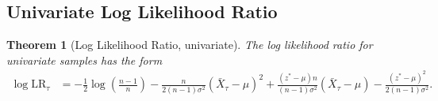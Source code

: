 \documentclass{article}
\theoremstyle{plain}
\newtheorem{theorem}{Theorem}[section]
\theoremstyle{definition}
\theoremstyle{remark}
\begin{document}
\subsection{Univariate Log Likelihood Ratio}
\label{app:proof-log-lr}

\begin{theorem}[Log Likelihood Ratio, univariate]
    \label{thm:log-lr}
    The log likelihood ratio for univariate samples has the form
    \begin{align*}
        \log \mathrm{LR}_\tau & = -\frac{1}{2}\log\left(\frac{n-1}{n}\right) - \frac{n}{2(n-1)\sigma^2}(\bar{X}_\tau - \mu)^2 + \frac{(z^* - \mu) n}{(n-1)\sigma^2}(\bar{X}_\tau - \mu) - \frac{(z^* - \mu)^2}{2(n-1)\sigma^2}.
    \end{align*}
\end{theorem}
\end{document}
